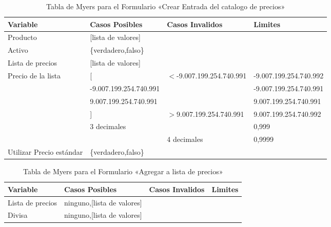 \begin{table}
\centering
\begin{tabular}{|p{3.0cm}|p{4.0cm}|p{4.0cm}|l|}
\hline
\footnotesize{\textbf{Variable}} & \footnotesize{\textbf{Casos Posibles}} & \footnotesize{\textbf{Casos Invalidos}} & \footnotesize{\textbf{Limites}} \\
\hline
\footnotesize{Producto} & \footnotesize{[lista de valores]} & & \\
\hline
\footnotesize{Activo}  & \footnotesize{\{verdadero,falso\}} & & \\
\hline
\footnotesize{Lista de precios} & \footnotesize{[lista de valores]} & & \\
\hline
\footnotesize{Precio de la lista} & \footnotesize{[} & \footnotesize{$<$-9.007.199.254.740.991} & \footnotesize{-9.007.199.254.740.992} \\
& \footnotesize{-9.007.199.254.740.991} & & \footnotesize{-9.007.199.254.740.991} \\
& \footnotesize{9.007.199.254.740.991} & & \footnotesize{9.007.199.254.740.991} \\
& \footnotesize{]} & \footnotesize{$>$9.007.199.254.740.991} & \footnotesize{9.007.199.254.740.992} \\
& \footnotesize{3 decimales} & & \footnotesize{0,999} \\
& & \footnotesize{4 decimales} & \footnotesize{0,9999} \\
\hline
\footnotesize{Utilizar Precio estándar} & \footnotesize{\{verdadero,falso\}} & & \\
\hline
\end{tabular}
\caption{Tabla de Myers para el Formulario «Crear Entrada del catalogo de precios»}
\label{myers_02}
\end{table}

\begin{table}
\centering
\begin{tabular}{|p{6.0cm}|l|l|l|}
\hline
\footnotesize{\textbf{Variable}} & \footnotesize{\textbf{Casos Posibles}} & \footnotesize{\textbf{Casos Invalidos}} & \footnotesize{\textbf{Limites}} \\
\hline
\footnotesize{Lista de precios} & \footnotesize{ninguno,[lista de valores]} & & \\
\hline
\footnotesize{Divisa} & \footnotesize{ninguno,[lista de valores]} & & \\
\hline
\end{tabular}
\caption{Tabla de Myers para el Formulario «Agregar a lista de precios»}
\label{myers_03}
\end{table}

